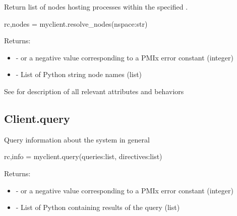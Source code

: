 \summary

Return list of nodes hosting processes within the specified .

\format

\pyspecificstart
\begin{codepar}
rc,nodes = myclient.resolve_nodes(nspace:str)
\end{codepar}
\pyspecificend

\begin{arglist}
\end{arglist}

Returns:

\begin{itemize}
    \item {} -  or a negative value corresponding to a PMIx error constant (integer)
    \item {} - List of Python string node names (list)
\end{itemize}


See  for description of all relevant attributes and behaviors


\subsection{Client.query}

\summary

Query information about the system in general

\format

\pyspecificstart
\begin{codepar}
rc,info = myclient.query(queries:list, directives:list)
\end{codepar}
\pyspecificend

\begin{arglist}
\end{arglist}

Returns:

\begin{itemize}
    \item {} -  or a negative value corresponding to a PMIx error constant (integer)
    \item {} - List of Python  containing results of the query (list)
\end{itemize}



